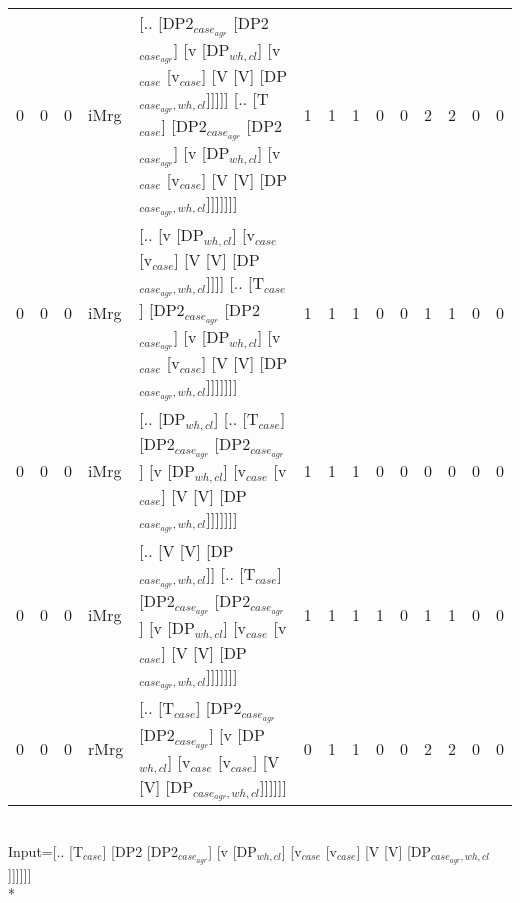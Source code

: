 \begin{tabularx}{\linewidth}{rrrlXrrrrrrrrr}
   0 &       0 &   0 & iMrg & [.. [DP2$_{case_{agr}}$ [DP2$_{case_{agr}}$] [v [DP$_{wh,cl}$] [v$_{case}$ [v$_{case}$] [V [V] [DP$_{case_{agr},wh,cl}$]]]]] [.. [T$_{case}$] [DP2$_{case_{agr}}$ [DP2$_{case_{agr}}$] [v [DP$_{wh,cl}$] [v$_{case}$ [v$_{case}$] [V [V] [DP$_{case_{agr},wh,cl}$]]]]]]] &            1 &             1 &             1 &                  0 &              0 &           2 &           2 &              0 &            0 \\
   0 &       0 &   0 & iMrg & [.. [v [DP$_{wh,cl}$] [v$_{case}$ [v$_{case}$] [V [V] [DP$_{case_{agr},wh,cl}$]]]] [.. [T$_{case}$] [DP2$_{case_{agr}}$ [DP2$_{case_{agr}}$] [v [DP$_{wh,cl}$] [v$_{case}$ [v$_{case}$] [V [V] [DP$_{case_{agr},wh,cl}$]]]]]]]                               &            1 &             1 &             1 &                  0 &              0 &           1 &           1 &              0 &            0 \\
   0 &       0 &   0 & iMrg & [.. [DP$_{wh,cl}$] [.. [T$_{case}$] [DP2$_{case_{agr}}$ [DP2$_{case_{agr}}$] [v [DP$_{wh,cl}$] [v$_{case}$ [v$_{case}$] [V [V] [DP$_{case_{agr},wh,cl}$]]]]]]]                                                                                 &            1 &             1 &             1 &                  0 &              0 &           0 &           0 &              0 &            0 \\
   0 &       0 &   0 & iMrg & [.. [V [V] [DP$_{case_{agr},wh,cl}$]] [.. [T$_{case}$] [DP2$_{case_{agr}}$ [DP2$_{case_{agr}}$] [v [DP$_{wh,cl}$] [v$_{case}$ [v$_{case}$] [V [V] [DP$_{case_{agr},wh,cl}$]]]]]]]                                                                &            1 &             1 &             1 &                  1 &              0 &           1 &           1 &              0 &            0 \\
   0 &       0 &   0 & rMrg & [.. [T$_{case}$] [DP2$_{case_{agr}}$ [DP2$_{case_{agr}}$] [v [DP$_{wh,cl}$] [v$_{case}$ [v$_{case}$] [V [V] [DP$_{case_{agr},wh,cl}$]]]]]]                                                                                                 &            0 &             1 &             1 &                  0 &              0 &           2 &           2 &              0 &            0 \\
\hline
\end{tabularx}\endgroup\\
\begingroup\scriptsize Input=[.. [T$_{case}$] [DP2 [DP2$_{case_{agr}}$] [v [DP$_{wh,cl}$] [v$_{case}$ [v$_{case}$] [V [V] [DP$_{case_{agr},wh,cl}$]]]]]]\\*
